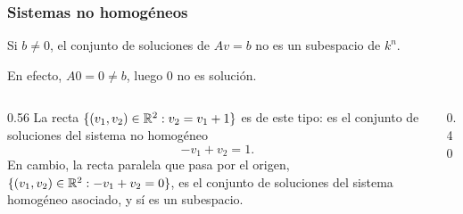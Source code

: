 \begin{frame}
    \frametitle{Sistemas no homogéneos}

    \begin{example}
        Si $b\neq0$, el conjunto de soluciones de $Av=b$
        \alert{no} es un subespacio de $k^n$.
    \end{example}

    \medskip

    En efecto, $A0=0\neq b$, luego $0$ no es solución.

    \medskip

    \begin{columns}[T]
        \begin{column}{0.56\textwidth}
            La recta $\{(v_1,v_2)\in\mathbb{R}^2: v_2=v_1+1\}$ es de este tipo:
            es el conjunto de soluciones del sistema no homogéneo
            \[
                -v_1+v_2=1.
            \]
            En cambio, la recta paralela que pasa por el origen,
            $\{(v_1,v_2)\in\mathbb{R}^2: -v_1+v_2=0\}$, es el conjunto de soluciones
            del \alert{sistema homogéneo asociado}, y sí es un subespacio.
        \end{column}
        \begin{column}{0.40\textwidth}
            \centering
        \end{column}
    \end{columns}
\end{frame}



